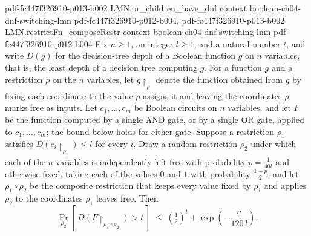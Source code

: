 \begin{lemma}
{    pdf-fc447f326910-p013-b002}
\proofstep
  {LMN.or_children_have_dnf}
  {context}
  {boolean-ch04-dnf-switching-lmn}
  {pdf-fc447f326910-p012-b004,
    pdf-fc447f326910-p013-b002}
\proofstep
  {LMN.restrictFn_composeRestr}
  {context}
  {boolean-ch04-dnf-switching-lmn}
  {pdf-fc447f326910-p012-b004}
Fix $n \ge 1$, an integer $l \ge 1$, and a natural number $t$, and write $D(g)$ for the
decision-tree depth of a Boolean function $g$ on $n$ variables, that is, the least depth
of a decision tree computing $g$. For a function $g$ and a restriction $\rho$ on the $n$
variables, let $g\!\restriction_{\rho}$ denote the function obtained from $g$ by fixing
each coordinate to the value $\rho$ assigns it and leaving the coordinates $\rho$ marks
free as inputs. Let $c_1,\dots,c_m$ be Boolean circuits on $n$ variables, and let $F$ be
the function computed by a single AND gate, or by a single OR gate, applied to
$c_1,\dots,c_m$; the bound below holds for either gate. Suppose a restriction $\rho_1$
satisfies $D\!\left(c_i\!\restriction_{\rho_1}\right) \le l$ for every $i$. Draw a
random restriction $\rho_2$ under which each of the $n$ variables is independently left
free with probability $p = \tfrac{1}{40 l}$ and otherwise fixed, taking each of the
values $0$ and $1$ with probability $\tfrac{1-p}{2}$, and let $\rho_1 \circ \rho_2$ be
the composite restriction that keeps every value fixed by $\rho_1$ and applies $\rho_2$
to the coordinates $\rho_1$ leaves free. Then
\[
\Pr_{\rho_2}\!\left[\, D\!\left(F\!\restriction_{\rho_1 \circ \rho_2}\right) > t
\,\right]
  \;\le\; \left(\tfrac{1}{2}\right)^{t} + \exp\!\left(-\frac{n}{120\, l}\right).
\]
\end{lemma}
